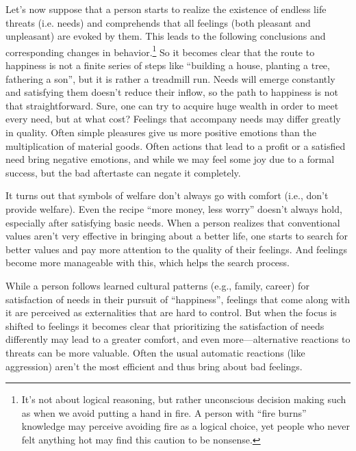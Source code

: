 \documentclass[12pt]{report}
\begin{document}
\noindent Let’s now suppose that a person starts to realize the existence of endless life threats (i.e. needs) and comprehends that all feelings (both pleasant and unpleasant) are evoked by them. This leads to the following conclusions and corresponding changes in behavior.\footnote{It’s not about logical reasoning, but rather unconscious decision making such as when we avoid putting a hand in fire. A person with ``fire burns'' knowledge may perceive avoiding fire as a logical choice, yet people who never felt anything hot may find this caution to be nonsense.} So it becomes clear that the route to happiness is not a finite series of steps like ``building a house, planting a tree, fathering a son'', but it is rather a treadmill run. Needs will emerge constantly and satisfying them doesn’t reduce their inflow, so the path to happiness is not that straightforward. Sure, one can try to acquire huge wealth in order to meet every need, but at what cost? Feelings that accompany needs may differ greatly in quality. Often simple pleasures give us more positive emotions than the multiplication of material goods. Often actions that lead to a profit or a satisfied need bring negative emotions, and while we may feel some joy due to a formal success, but the bad aftertaste can negate it completely.

\noindent It turns out that symbols of welfare don’t always go with comfort (i.e., don’t provide welfare). Even the recipe ``more money, less worry'' doesn’t always hold, especially after satisfying basic needs. When a person realizes that conventional values aren’t very effective in bringing about a better life, one starts to search for better values and pay more attention to the quality of their feelings. And feelings become more manageable with this, which helps the search process.

\noindent While a person follows learned cultural patterns (e.g., family, career) for satisfaction of needs in their pursuit of ``happiness'', feelings that come along with it are perceived as externalities that are hard to control. But when the focus is shifted to feelings it becomes clear that prioritizing the satisfaction of needs differently may lead to a greater comfort, and even more\thinspace---\thinspace alternative reactions to threats can be more valuable. Often the usual automatic reactions (like aggression) aren’t the most efficient and thus bring about bad feelings.
\end{document}
